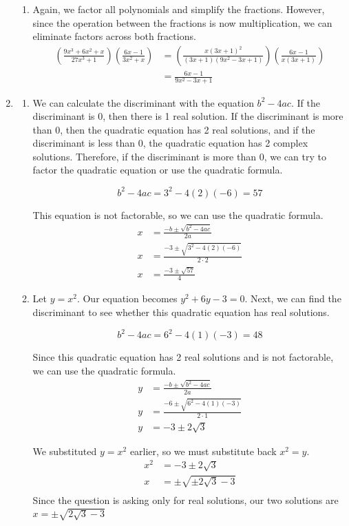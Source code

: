 \documentclass[11pt, letterpaper, twoside, tikz]{article}
\begin{document}
\begin{enumerate}
\begin{enumerate}[label=(\alph*)]
\item Again, we factor all polynomials and simplify the fractions. However, since the operation between the fractions is now multiplication, we can eliminate factors across both fractions.
\begin{align*}
\left(\frac{9x^3+6x^2+x}{27x^3+1}\right)\left(\frac{6x-1}{3x^2+x}\right)&= \left( \frac{x(3x+1)^2}{(3x+1)(9x^2-3x+1)}\right) \left(\frac{6x-1}{x(3x+1)}\right)\\
&= \frac{6x-1}{9x^2-3x+1}
\end{align*}
\end{enumerate}
\item \begin{enumerate}[label=(\alph*)]

\item We can calculate the discriminant with the equation $b^2-4ac$. If the discriminant is 0, then there is 1 real solution. If the discriminant is more than 0, then the quadratic equation has 2 real solutions, and if the discriminant is less than 0, the quadratic equation has 2 complex solutions. Therefore, if the discriminant is more than 0, we can try to factor the quadratic equation or use the quadratic formula.

$$b^2-4ac=3^2-4(2)(-6)=57$$

This equation is not factorable, so we can use the quadratic formula.
\begin{align*}
x &= \frac{-b\pm \sqrt{b^2-4ac}}{2a}\\
x &= \frac{-3\pm \sqrt{3^2-4(2)(-6)}}{2\cdot 2}\\
x &= \frac{-3\pm \sqrt{57}}{4}
\end{align*}

\item Let $y=x^2$. Our equation becomes $y^2+6y-3=0$. Next, we can find the discriminant to see whether this quadratic equation has real solutions.

$$b^2-4ac=6^2-4(1)(-3)=48$$

Since this quadratic equation has 2 real solutions and is not factorable, we can use the quadratic formula.
\begin{align*}
y &= \frac{-b\pm \sqrt{b^2-4ac}}{2a}\\
y &= \frac{-6\pm \sqrt{6^2-4(1)(-3)}}{2\cdot 1}\\
y &= -3\pm2\sqrt3
\end{align*}

We substituted $y=x^2$ earlier, so we must substitute back $x^2=y$.
\begin{align*}
x^2 &= -3\pm2\sqrt3\\
x &= \pm\sqrt{\pm2\sqrt{3}-3}\\
\end{align*}
Since the question is asking only for real solutions, our two solutions are $\boxed {x=\pm\sqrt{2\sqrt3-3}}$


\end{enumerate}
\end{enumerate}
\end{document}
